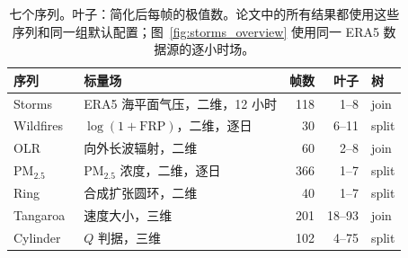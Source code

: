 \begin{table}[t]
\centering
\caption{七个序列。叶子：简化后每帧的极值数。论文中的所有结果都使用这些序列和同一组默认配置；图~\ref{fig:storms_overview} 使用同一 ERA5 数据源的逐小时场。}
\label{tab:data}
\footnotesize
\setlength{\tabcolsep}{2.5pt}
\renewcommand{\arraystretch}{0.95}
\begin{tabular*}{\columnwidth}{@{\extracolsep{\fill}}llrrl@{}}
\toprule
序列 & 标量场 & 帧数 & 叶子 & 树 \\
\midrule
Storms~\cite{Hersbach:2020:ERA5} & ERA5 海平面气压，二维，12 小时 & 118 & 1--8 & join \\
Wildfires~\cite{Franke:2021:1DP} & $\log(1+\mathrm{FRP})$，二维，逐日 & 30 & 6--11 & split \\
OLR~\cite{NOAA:OLR} & 向外长波辐射，二维 & 60 & 2--8 & join \\
PM$_{2.5}$~\cite{Dong:2026:PM25} & PM$_{2.5}$ 浓度，二维，逐日 & 366 & 1--7 & split \\
Ring~\cite{Koepp:2023:TMTM} & 合成扩张圆环，二维 & 40 & 1--7 & split \\
Tangaroa~\cite{Popinet:2004:Tangaroa} & 速度大小，三维 & 201 & 18--93 & join \\
Cylinder~\cite{Camarri:2005:Cylinder,Weinkauf:SquareCylinder} & $Q$ 判据，三维 & 102 & 4--75 & split \\
\bottomrule
\end{tabular*}
\end{table}
